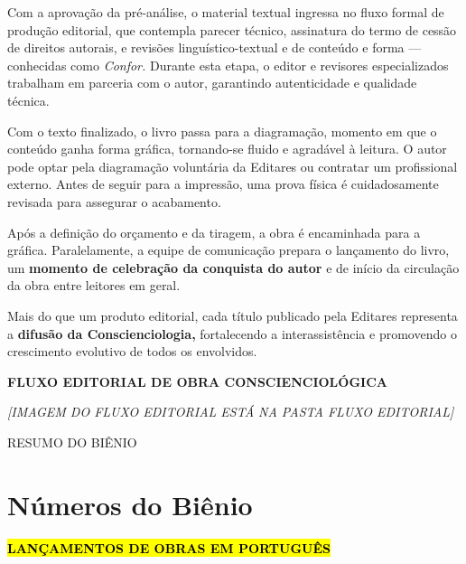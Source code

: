 \documentclass[
]{article}
\begin{document}
Com a aprovação da pré-análise, o material textual ingressa no fluxo formal de produção editorial, que contempla parecer técnico, assinatura do termo de cessão de direitos autorais, e revisões linguístico-textual e de conteúdo e forma --- conhecidas como \emph{Confor.} Durante esta etapa, o editor e revisores especializados trabalham em parceria com o autor, garantindo autenticidade e qualidade técnica.

Com o texto finalizado, o livro passa para a diagramação, momento em que o conteúdo ganha forma gráfica, tornando-se fluido e agradável à leitura. O autor pode optar pela diagramação voluntária da Editares ou contratar um profissional externo. Antes de seguir para a impressão, uma prova física é cuidadosamente revisada para assegurar o acabamento.

Após a definição do orçamento e da tiragem, a obra é encaminhada para a gráfica. Paralelamente, a equipe de comunicação prepara o lançamento do livro, um \textbf{momento de celebração da conquista do autor} e de início da circulação da obra entre leitores em geral.

Mais do que um produto editorial, cada título publicado pela Editares representa a \textbf{difusão da Conscienciologia,} fortalecendo a interassistência e promovendo o crescimento evolutivo de todos os envolvidos.

\textbf{FLUXO EDITORIAL DE OBRA CONSCIENCIOLÓGICA}

\emph{{[}IMAGEM DO FLUXO EDITORIAL ESTÁ NA PASTA FLUXO EDITORIAL{]}}

RESUMO DO BIÊNIO

\section{Números do Biênio}\label{nuxfameros-do-biuxeanio}

\textbf{\hl{LANÇAMENTOS DE OBRAS EM PORTUGUÊS}}
\end{document}

